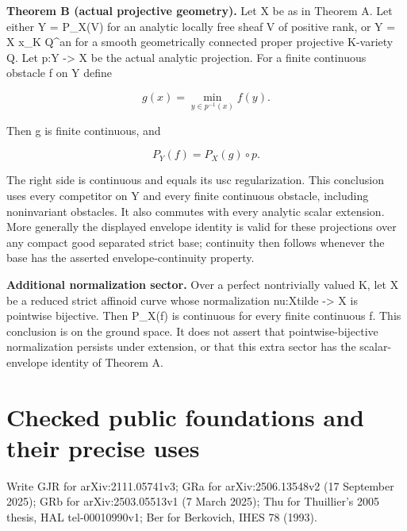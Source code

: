 \documentclass[11pt]{article}
\begin{document}
\textbf{Theorem B (actual projective geometry).} Let X be as in Theorem A. Let either Y = P\_X(V) for an analytic locally free sheaf V of positive rank, or Y = X x\_K Q\textasciicircum{}an for a smooth geometrically connected proper projective K-variety Q. Let p:Y -> X be the actual analytic projection. For a finite continuous obstacle f on Y define

\[
g(x)=\min_{y\in p^{-1}(x)} f(y).
\]

Then g is finite continuous, and

\[
P_Y(f)=P_X(g)\circ p.
\]

The right side is continuous and equals its usc regularization. This conclusion uses every competitor on Y and every finite continuous obstacle, including noninvariant obstacles. It also commutes with every analytic scalar extension. More generally the displayed envelope identity is valid for these projections over any compact good separated strict base; continuity then follows whenever the base has the asserted envelope-continuity property.

\textbf{Additional normalization sector.} Over a perfect nontrivially valued K, let X be a reduced strict affinoid curve whose normalization nu:Xtilde -> X is pointwise bijective. Then P\_X(f) is continuous for every finite continuous f. This conclusion is on the ground space. It does not assert that pointwise-bijective normalization persists under extension, or that this extra sector has the scalar-envelope identity of Theorem A.

\section{Checked public foundations and their precise uses}

Write GJR for arXiv:2111.05741v3; GRa for arXiv:2506.13548v2 (17 September 2025); GRb for arXiv:2503.05513v1 (7 March 2025); Thu for Thuillier's 2005 thesis, HAL tel-00010990v1; Ber for Berkovich, IHES 78 (1993).
\end{document}
